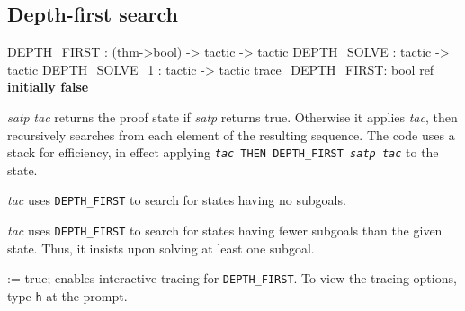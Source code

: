 \subsection{Depth-first search}
\begin{ttbox} 
DEPTH_FIRST   : (thm->bool) -> tactic -> tactic
DEPTH_SOLVE   :                tactic -> tactic
DEPTH_SOLVE_1 :                tactic -> tactic
trace_DEPTH_FIRST: bool ref \hfill{\bf initially false}
\end{ttbox}
\begin{ttdescription}
\item[\ttindexbold{DEPTH_FIRST} {\it satp} {\it tac}] 
returns the proof state if {\it satp} returns true.  Otherwise it applies
{\it tac}, then recursively searches from each element of the resulting
sequence.  The code uses a stack for efficiency, in effect applying
\hbox{\tt {\it tac} THEN DEPTH_FIRST {\it satp} {\it tac}} to the state.

\item[\ttindexbold{DEPTH_SOLVE} {\it tac}] 
uses {\tt DEPTH_FIRST} to search for states having no subgoals.

\item[\ttindexbold{DEPTH_SOLVE_1} {\it tac}] 
uses {\tt DEPTH_FIRST} to search for states having fewer subgoals than the
given state.  Thus, it insists upon solving at least one subgoal.

\item[\ttindexbold{trace_DEPTH_FIRST} := true;] 
enables interactive tracing for {\tt DEPTH_FIRST}.  To view the
tracing options, type {\tt h} at the prompt.
\end{ttdescription}


